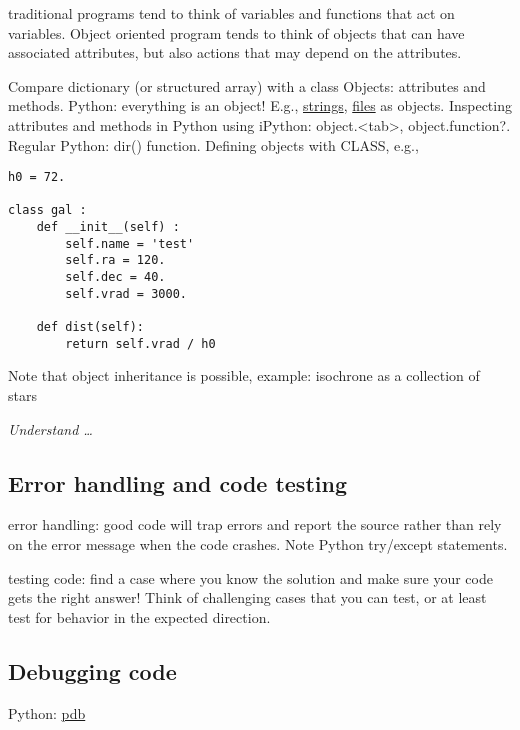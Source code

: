 \documentclass{article}
\newcommand{\test}[1]{%
    \begin{center}
        \colorbox{hl}{\parbox{0.9\textwidth}{\emph{#1}}}
    \end{center}}
\begin{document}
traditional programs tend to think of variables and functions that act
on variables. Object oriented program tends to think of objects that
can have associated attributes, but also actions that may depend on
the attributes.

Compare dictionary (or structured array) with a class
Objects: attributes and methods.
Python:
everything is an object! E.g.,
\href{https://docs.python.org/2/library/stdtypes.html#string-methods}
{strings},
\href{https://docs.python.org/2/tutorial/inputoutput.html#methods-of-file-objects}
{files} as objects.
Inspecting attributes and methods in Python using iPython:
object.<tab>, object.function?. Regular Python: dir() function.
Defining objects with CLASS, e.g.,
\begin{verbatim}
h0 = 72.

class gal :
    def __init__(self) :
        self.name = 'test'
        self.ra = 120.
        self.dec = 40.
        self.vrad = 3000.

    def dist(self):
        return self.vrad / h0
\end{verbatim}
Note that object inheritance is possible, example:
isochrone as a collection of stars

\test{Understand \ldots}

\subsection{Error handling and code testing}

error handling: good code will trap errors and report the source
rather than rely on the error message when the code crashes. Note
Python try/except statements.

testing code: find a case where you know the solution and make sure
your code gets the right answer! Think of challenging cases that you
can test, or at least test for behavior in the expected direction.

\subsection{Debugging code}
Python: \href{https://docs.python.org/2/library/pdb.html}{pdb}
\end{document}
